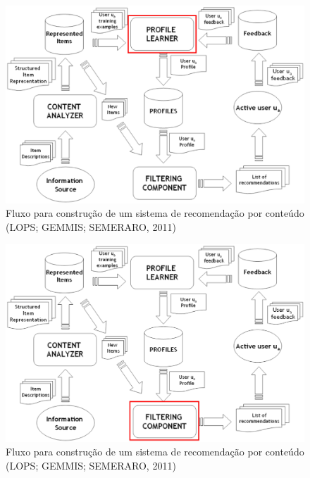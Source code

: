 \begin{frame}

\begin{figure}[h!]
  \centering
    \includegraphics[width=1\textwidth]{figura/recomendacao_conteudo_3.eps}
  \caption{Fluxo para construção de um sistema de recomendação por conteúdo (LOPS; GEMMIS; SEMERARO, 2011)}
\end{figure}

\end{frame}

\begin{frame}

\begin{figure}[h!]
  \centering
    \includegraphics[width=1\textwidth]{figura/recomendacao_conteudo_4.eps}
  \caption{Fluxo para construção de um sistema de recomendação por conteúdo (LOPS; GEMMIS; SEMERARO, 2011)}
\end{figure}

\end{frame}

